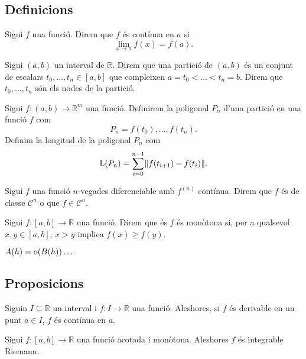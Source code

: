 \documentclass[../Apunts.tex]{subfiles}
\begin{document}
	\subsection{Definicions}
	\begin{definition}
		\label{def:funcio continua}\label{def:funció contínua}
		Sigui \(f\) una funció. Direm que \(f\) és contínua en \(a\) si
		\[\lim_{x\to a}f(x)=f(a).\]
	\end{definition}
	\begin{definition}
		\label{def:partició}
		\label{def:poligonal}
		\label{def:longitud de poligonal}
		Sigui \((a,b)\) un interval de \(\mathbb{R}\). Direm que una partició de \((a,b)\) és un conjunt de escalars \(t_{0},\dots,t_{n}\in[a,b]\) que compleixen \(a=t_{0}<\dots<t_{n}=b\). Direm que \(t_{0},\dots,t_{n}\) són els nodes de la partició.
		
		Sigui \(f\colon(a,b)\to\mathbb{R}^{m}\) una funció. Definirem la poligonal \(P_{n}\) d'una partició en una funció \(f\) com
		\[P_{n}=f(t_{0}),\dots,f(t_{n}).\]
		Definim la longitud de la poligonal \(P_{n}\) com
		\[\Long(P_{n})=\sum_{i=0}^{n-1}\left\lVert f(t_{i+1})-f(t_{i})\right\rVert.\]
	\end{definition}
	\begin{definition}
		\label{def:Classe de diferenciabilitat}
		Sigui \(f\) una funció \(n\)-vegades diferenciable amb \(f^{(n)}\) contínua. Direm que \(f\) és de classe \(\mathcal{C}^{n}\) o que \(f\in\mathcal{C}^{n}\).
	\end{definition}
	\begin{definition}
		\label{def:funció monòtona}
		Sigui \(f\colon[a,b]\to\mathbb{R}\) una funció. Direm que és \(f\) és monòtona si, per a qualsevol \(x,y\in[a,b]\), \(x>y\) implica \(f(x)\geq f(y)\).
	\end{definition}
	\begin{definition}
		\label{def:Landau}
		\(A(h)=\operatorname{o}(B(h))\dots\)
	\end{definition}
	\subsection{Proposicions}
	\begin{proposition}\label{prop:Derivable implica contínua}
		Siguin \(I\subseteq\mathbb{R}\) un interval i \(f\colon I\to\mathbb{R}\) una funció. Aleshores, si \(f\) és derivable en un punt \(a\in I\), \(f\) és contínua en \(a\).
	\end{proposition}
	\begin{proposition}
		Sigui \(f\colon[a,b]\to\mathbb{R}\) una funció acotada i monòtona. Aleshores \(f\) és integrable Riemann.
	\end{proposition}
\end{document}
